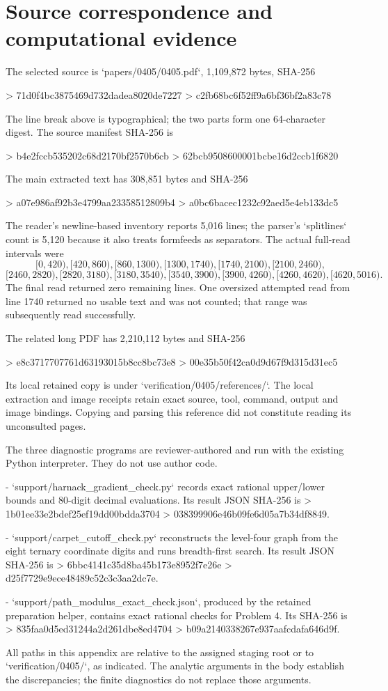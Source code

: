 \documentclass[10pt]{article}
\begin{document}
\section*{Source correspondence and computational evidence}
The selected source is `papers/0405/0405.pdf`, 1,109,872 bytes, SHA-256\par
> 71d0f4bc3875469d732dadea8020de7227
> c2fb68bc6f52ff9a6bf36bf2a83c78\par
The line break above is typographical; the two parts form one 64-character digest. The source manifest SHA-256 is\par
> b4e2fccb535202c68d2170bf2570b6cb
> 62bcb9508600001bcbe16d2ccb1f6820\par
The main extracted text has 308,851 bytes and SHA-256\par
> a07e986af92b3e4799aa23358512809b4
> a0bc6bacec1232c92aed5e4eb133dc5\par
The reader’s newline-based inventory reports 5,016 lines; the parser’s `splitlines` count is 5,120 because it also treats formfeeds as separators. The actual full-read intervals were \[[0,420),[420,860),[860,1300),[1300,1740),
 [1740,2100),[2100,2460),\] \[[2460,2820),[2820,3180),[3180,3540),[3540,3900),
 [3900,4260),[4260,4620),[4620,5016).\] The final read returned zero remaining lines. One oversized attempted read from line 1740 returned no usable text and was not counted; that range was subsequently read successfully.\par
The related long PDF has 2,210,112 bytes and SHA-256\par
> e8c3717707761d63193015b8cc8bc73e8
> 00e35b50f42ca0d9d67f9d315d31ec5\par
Its local retained copy is under `verification/0405/references/`. The local extraction and image receipts retain exact source, tool, command, output and image bindings. Copying and parsing this reference did not constitute reading its unconsulted pages.\par
The three diagnostic programs are reviewer-authored and run with the existing Python interpreter. They do not use author code.\par
- `support/harnack\_gradient\_check.py` records exact rational upper/lower bounds and 80-digit decimal evaluations. Its result JSON SHA-256 is
  > 1b01ee33e2bdef25ef19dd00bdda3704
> 038399906e46b09fe6d05a7b34df8849.\par
- `support/carpet\_cutoff\_check.py` reconstructs the level-four graph from the eight ternary coordinate digits and runs breadth-first search. Its result JSON SHA-256 is
  > 6bbc4141c35d8ba45b173e8952f7e26e
> d25f7729e9ece48489c52c3c3aa2dc7e.\par
- `support/path\_modulus\_exact\_check.json`, produced by the retained preparation helper, contains exact rational checks for Problem 4. Its SHA-256 is
  > 835faa0d5ed31244a2d261dbe8ed4704
> b09a2140338267e937aafcdafa646d9f.\par
All paths in this appendix are relative to the assigned staging root or to `verification/0405/`, as indicated. The analytic arguments in the body establish the discrepancies; the finite diagnostics do not replace those arguments.\par
\end{document}
